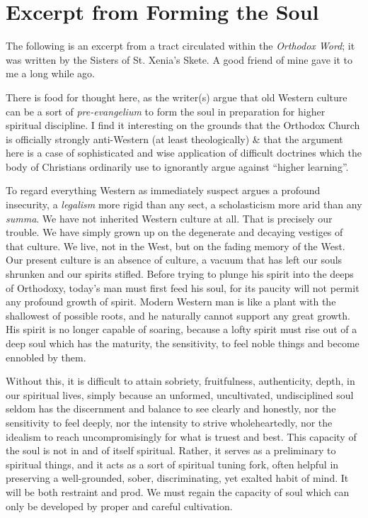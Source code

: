 \section{Excerpt from Forming the Soul}

\begin{quotex}
The following is an excerpt from a tract circulated within the \emph{Orthodox Word}; it was written by the Sisters of St. Xenia's Skete. A good friend of mine gave it to me a long while ago.

There is food for thought here, as the writer(s) argue that old Western culture can be a sort of \emph{pre-evangelium} to form the soul in preparation for higher spiritual discipline. I find it interesting on the grounds that the Orthodox Church is officially strongly anti-Western (at least theologically) \& that the argument here is a case of sophisticated and wise application of difficult doctrines which the body of Christians ordinarily use to ignorantly argue against “higher learning”.

\end{quotex}
To regard everything Western as immediately suspect argues a profound insecurity, a \emph{legalism} more rigid than any sect, a scholasticism more arid than any \emph{summa}. We have not inherited Western culture at all. That is precisely our trouble. We have simply grown up on the degenerate and decaying vestiges of that culture. We live, not in the West, but on the fading memory of the West. Our present culture is an absence of culture, a vacuum that has left our souls shrunken and our spirits stifled. Before trying to plunge his spirit into the deeps of Orthodoxy, today's man must first feed his soul, for its paucity will not permit any profound growth of spirit. Modern Western man is like a plant with the shallowest of possible roots, and he naturally cannot support any great growth. His spirit is no longer capable of soaring, because a lofty spirit must rise out of a deep soul which has the maturity, the sensitivity, to feel noble things and become ennobled by them.

Without this, it is difficult to attain sobriety, fruitfulness, authenticity, depth, in our spiritual lives, simply because an unformed, uncultivated, undisciplined soul seldom has the discernment and balance to see clearly and honestly, nor the sensitivity to feel deeply, nor the intensity to strive wholeheartedly, nor the idealism to reach uncompromisingly for what is truest and best. This capacity of the soul is not in and of itself spiritual. Rather, it serves as a preliminary to spiritual things, and it acts as a sort of spiritual tuning fork, often helpful in preserving a well-grounded, sober, discriminating, yet exalted habit of mind. It will be both restraint and prod. We must regain the capacity of soul which can only be developed by proper and careful cultivation.

